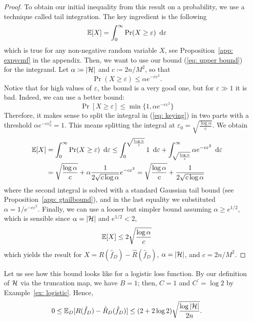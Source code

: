 \documentclass[reqno]{amsart}
\begin{document}
\begin{theorem}
\begin{proof}
To obtain our initial inequality from this result on a probability, we use a technique called tail integration. The key ingredient is the following
\begin{equation}\label{eq: keying}
    \mathbb{E}[X] = \int_0^\infty \Pr(X\ge \varepsilon) \mathop{}\!\,\,\mathrm{d} \varepsilon
\end{equation}
which is true for any non-negative random variable $X$, see Proposition~\ref{app: expvcmf} in the appendix. Then, we want to use our bound (\ref{eq: upper bound}) for the integrand. Let $\alpha\coloneq \vert\mathcal{H}\vert$ and $c\coloneq 2n/M^2$, so that
\[
\Pr (X\ge \varepsilon) \le \alpha e^{-c\varepsilon^2}.
\] 
Notice that for high values of $\varepsilon$, the bound is a very good one, but for $\varepsilon \gg 1$ it is bad. Indeed, we can use a better bound:
\begin{equation}
    \Pr[X\ge \varepsilon] \le \min\{1, \alpha  e^{-c\varepsilon^2}\}
\end{equation}
Therefore, it makes sense to split the integral in (\ref{eq: keying}) in two parts with a threshold $\alpha  e^{-c\varepsilon_0^2} = 1$. This means splitting the integral at $\varepsilon_0 = \sqrt{\frac{\log \alpha}{c}}$. We obtain 
\begin{align*}
\mathbb{E}[X] &= \int_0^\infty \Pr(X\ge \varepsilon) \mathop{}\!\,\,\mathrm{d} \varepsilon \le \int_0^{\sqrt\frac{\log \alpha}{c}} 1 \mathop{}\!\,\,\mathrm{d} \varepsilon + \int_{\sqrt\frac{\log \alpha}{c}}^\infty \alpha e^{-c\varepsilon^2}\mathop{}\!\,\,\mathrm{d} \varepsilon\\
&=\sqrt\frac{\log \alpha}{c} + \alpha\frac{1}{2\sqrt{c\log \alpha}}e^{-c\varepsilon^2} = \sqrt\frac{\log \alpha}{c} + \frac{1}{2\sqrt{c\log \alpha}}
\end{align*}
where the second integral is solved with a standard Gaussian tail bound (see Proposition~\ref{app: gtailbound}), and in the last equality we substituted $\alpha = 1/e^{-c\varepsilon^2}$. Finally, we can use a looser but simpler bound assuming  $\alpha\ge e^{1/2}$, which is sensible since $\alpha=\vert\mathcal{H}\vert $ and $e^{1/2}<2$,
\begin{equation}\label{eq}
    \mathbb{E}[X] \le 2\sqrt\frac{\log \alpha}{c}
\end{equation}
which yields the result for $X = R(\hat f_D)-\hat R(\hat f_D)$, $\alpha = \vert \mathcal{H}\vert$, and $c=2n/M^2$. 
\end{proof}
\end{theorem}

\begin{example}
Let us see how this bound looks like for a logistic loss function. By our definition of $\mathcal{H}$ via the truncation map, we have $B=1$; then, $C = 1$ and $C^\prime = \log2$ by Example~\ref{ex: logistic}. Hence,
\begin{equation}
        0 \le \mathbb{E}_D[ R(\hat f_D) - \hat R_D(\hat f_D)] \le (2+2\log 2)\sqrt{\frac{\log \vert \mathcal{H} \vert}{2n}}.
\end{equation}
\end{example}
\end{document}
